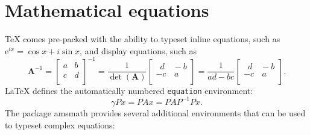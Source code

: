 \documentclass[
  digital,     %
  oneside,     %
  nosansbold,  %
  nocolorbold, %
  lof,         %
  lot,         %
]{fithesis4}
\begin{document}
\chapter{Mathematical equations}
\label{chap:matheq}
\TeX{} comes pre-packed with the ability to typeset inline
equations, such as $\mathrm{e}^{ix}=\cos x+i\sin x$, and display
equations, such as \[
  \mathbf{A}^{-1} = \begin{bmatrix}
  a & b \\ c & d \\
  \end{bmatrix}^{-1} =
  \frac{1}{\det(\mathbf{A})} \begin{bmatrix}
  \,\,\,d & \!\!-b \\ -c & \,a \\
  \end{bmatrix} =
  \frac{1}{ad - bc} \begin{bmatrix}
  \,\,\,d & \!\!-b \\ -c & \,a \\
  \end{bmatrix}.
\] \LaTeX{} defines the automatically numbered \texttt{equation}
environment:
\begin{equation}
  \gamma Px = PAx = PAP^{-1}Px.
\end{equation}
The package \textsf{amsmath} provides several additional
environments that can be used to typeset complex equations:
\end{document}
